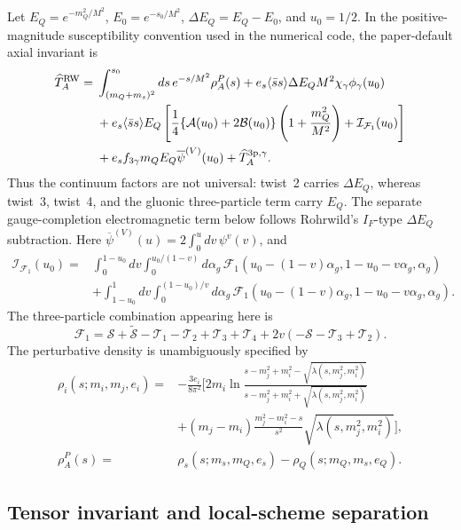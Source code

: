 \documentclass[11pt]{article}
\newcommand{\ssbar}{\langle\bar s s\rangle}
\begin{document}
Let $E_Q=e^{-m_Q^2/M^2}$, $E_0=e^{-s_0/M^2}$,
$\Delta E_Q=E_Q-E_0$, and $u_0=1/2$.  In the
positive-magnitude susceptibility convention used in the numerical code, the
paper-default axial invariant is
\begin{align}
 \widehat T_A^{\rm RW}={}&
 \int_{(m_Q+m_s)^2}^{s_0}ds\,e^{-s/M^2}\rho_A^P(s)
 +e_s\ssbar\Delta E_QM^2\chi_\gamma\phi_\gamma(u_0)\nonumber\\
 &+e_s\ssbar E_Q\left[
 \frac14\{\mathcal A(u_0)+2\mathcal B(u_0)\}
 \left(1+\frac{m_Q^2}{M^2}\right)
 +\mathcal I_{\mathcal F_1}(u_0)\right]\nonumber\\
 &+e_sf_{3\gamma}m_QE_Q\overline\psi^{(V)}(u_0)
 +\widehat T_A^{\rm 3p,\gamma}.
 \label{eq:app-axial-invariant}
\end{align}
Thus the continuum factors are not universal:
twist~2 carries $\Delta E_Q$, whereas twist~3, twist~4, and the gluonic
three-particle term carry $E_Q$.  The separate gauge-completion
electromagnetic term below follows Rohrwild's $I_F$-type
$\Delta E_Q$ subtraction.
Here
$\overline\psi^{(V)}(u)=2\int_0^u dv\,\psi^v(v)$, and
\begin{align}
 \mathcal I_{\mathcal F_1}(u_0)={}&
 \int_0^{1-u_0}\!dv\int_0^{u_0/(1-v)}\!d\alpha_g\,
 \mathcal F_1(u_0-(1-v)\alpha_g,1-u_0-v\alpha_g,\alpha_g)
 \nonumber\\
 &+\int_{1-u_0}^{1}\!dv\int_0^{(1-u_0)/v}\!d\alpha_g\,
 \mathcal F_1(u_0-(1-v)\alpha_g,1-u_0-v\alpha_g,\alpha_g).
 \label{eq:app-f1-integral}
\end{align}
The three-particle combination appearing here is
\begin{equation}
 \mathcal F_1=\mathcal S+\widetilde{\mathcal S}
 -\mathcal T_1-\mathcal T_2+\mathcal T_3+\mathcal T_4
 +2v(-\mathcal S-\mathcal T_3+\mathcal T_2).
\end{equation}
The perturbative density is unambiguously specified by
\begin{align}
 \rho_i(s;m_i,m_j,e_i)={}&-\frac{3e_i}{8\pi^2}
 \Bigg[2m_i\ln\frac{s-m_j^2+m_i^2-\sqrt{\lambda(s,m_j^2,m_i^2)}}
 {s-m_j^2+m_i^2+\sqrt{\lambda(s,m_j^2,m_i^2)}}\nonumber\\
 &+(m_j-m_i)\frac{m_j^2-m_i^2-s}{s^2}
 \sqrt{\lambda(s,m_j^2,m_i^2)}\Bigg],\nonumber\\
 \rho_A^P(s)={}&\rho_s(s;m_s,m_Q,e_s)-\rho_Q(s;m_Q,m_s,e_Q).
 \label{eq:app-rho-a}
\end{align}

\subsection{Tensor invariant and local-scheme separation}
\end{document}
